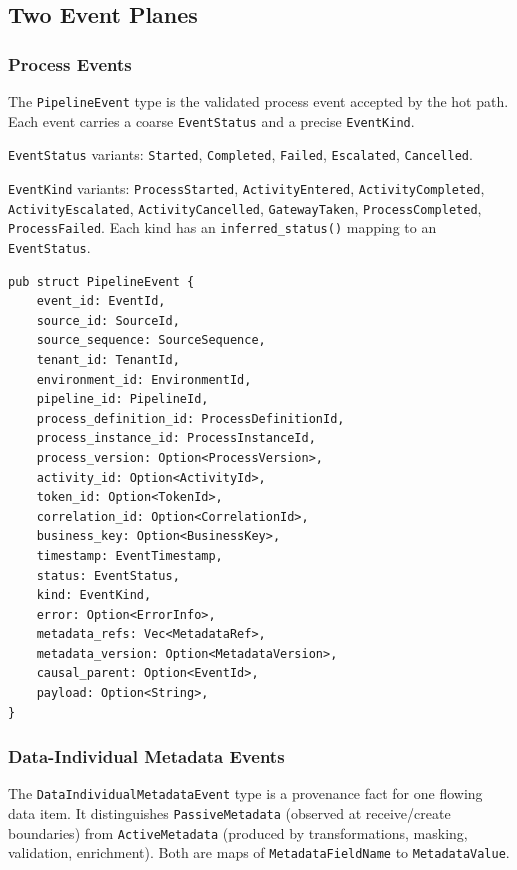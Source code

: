 \subsection{Two Event Planes}

\subsubsection{Process Events}

The \texttt{PipelineEvent} type is the validated process event accepted by the
hot path. Each event carries a coarse \texttt{EventStatus} and a precise
\texttt{EventKind}.

\texttt{EventStatus} variants: \texttt{Started}, \texttt{Completed},
\texttt{Failed}, \texttt{Escalated}, \texttt{Cancelled}.

\texttt{EventKind} variants: \texttt{ProcessStarted}, \texttt{ActivityEntered},
\texttt{ActivityCompleted}, \texttt{ActivityEscalated},
\texttt{ActivityCancelled}, \texttt{GatewayTaken}, \texttt{ProcessCompleted},
\texttt{ProcessFailed}. Each kind has an \texttt{inferred\_status()} mapping to
an \texttt{EventStatus}.

\begin{lstlisting}
pub struct PipelineEvent {
    event_id: EventId,
    source_id: SourceId,
    source_sequence: SourceSequence,
    tenant_id: TenantId,
    environment_id: EnvironmentId,
    pipeline_id: PipelineId,
    process_definition_id: ProcessDefinitionId,
    process_instance_id: ProcessInstanceId,
    process_version: Option<ProcessVersion>,
    activity_id: Option<ActivityId>,
    token_id: Option<TokenId>,
    correlation_id: Option<CorrelationId>,
    business_key: Option<BusinessKey>,
    timestamp: EventTimestamp,
    status: EventStatus,
    kind: EventKind,
    error: Option<ErrorInfo>,
    metadata_refs: Vec<MetadataRef>,
    metadata_version: Option<MetadataVersion>,
    causal_parent: Option<EventId>,
    payload: Option<String>,
}
\end{lstlisting}

\subsubsection{Data-Individual Metadata Events}

The \texttt{DataIndividualMetadataEvent} type is a provenance fact for one
flowing data item. It distinguishes \texttt{PassiveMetadata} (observed at
receive/create boundaries) from \texttt{ActiveMetadata} (produced by
transformations, masking, validation, enrichment). Both are maps of
\texttt{MetadataFieldName} to \texttt{MetadataValue}.

